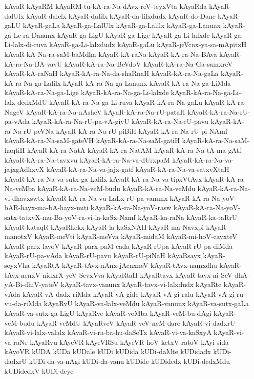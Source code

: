 {kAyaR
kAyaRM
kAyaRM-tu-kA-ra-Na-dAvx-reV-teyxVta
kAyaRda
kAyaR-dalUlx
kAyaR-dalelx
kAyaR-dalilx
kAyaR-da-lilxdudx
kAyaR-do-Dane
kAyaR-gaLU
kAyaR-gaLa
kAyaR-ga-LalUlx
kAyaR-ga-Lalilx
kAyaR-ga-Lanunx
kAyaR-ga-Le-ra-Danunx
kAyaR-ga-LigU
kAyaR-ga-Lige
kAyaR-ga-Li-lalxde
kAyaR-ga-Li-lalx-di-ruva
kAyaR-ga-Li-lalxdudx
kAyaR-gaLu
kAyaR-jeVcnx-ya-sa-mApitxH
kAyaR-kA-Na-ra-saM-baMdha
kAyaR-kA-raNa
kAyaR-kA-ra-Na-BAva
kAyaR-kA-ra-Na-BA-vavU
kAyaR-kA-ra-Na-BeVdoV
kAyaR-kA-ra-Na-Ga-samxreV
kAyaR-kA-raNaH
kAyaR-kA-ra-Na-da-shaRnaH
kAyaR-kA-ra-Na-gaLa
kAyaR-kA-ra-Na-ga-Lalilx
kAyaR-kA-ra-Na-ga-Lanunx
kAyaR-kA-ra-Na-ga-LiMda
kAyaR-kA-ra-Na-ga-Lige
kAyaR-kA-ra-Na-ga-Li-lalxde
kAyaR-kA-ra-Na-ga-Li-lalx-dedxMdU
kAyaR-kA-ra-Na-ga-Li-ruva
kAyaR-kA-ra-Na-gaLu
kAyaR-kA-ra-NageV
kAyaR-kA-ra-Na-nAsheV
kAyaR-kA-ra-Na-rU-pataH
kAyaR-kA-ra-Na-rU-pa-vAda
kAyaR-kA-ra-Na-rU-pa-vA-giyU
kAyaR-kA-ra-Na-rU-pavu
kAyaR-kA-ra-Na-rU-peVNa
kAyaR-kA-ra-Na-rU-piBiH
kAyaR-kA-ra-Na-rU-pi-NAmf
kAyaR-kA-ra-Na-saM-gateVH
kAyaR-kA-ra-Na-saM-gatiH
kAyaR-kA-ra-Na-saM-haqtiH
kAyaR-kA-ra-NatA
kAyaR-kA-ra-NatAM
kAyaR-kA-ra-Na-tA-ma-gAtf
kAyaR-kA-ra-Na-tavxvu
kAyaR-kA-ra-Na-va-dUrxpaM
kAyaR-kA-ra-Na-va-jajxgAdhxvX
kAyaR-kA-ra-Na-va-jajx-gatf
kAyaR-kA-ra-Na-va-satxvXtaH
kAyaR-kA-ra-Na-va-sutx-ga-Lalilx
kAyaR-kA-ra-Na-va-tipxVtAvx
kAyaR-kA-ra-Na-veMba
kAyaR-kA-ra-Na-veM-budu
kAyaR-kA-ra-Na-veMdu
kAyaR-kA-ra-Na-vi-dhavxswtx
kAyaR-kA-ra-Na-vu-LaLx-rU-pa-vanunx
kAyaR-kA-ra-Na-yoV-bAR-hayx-ma-bA-hayx-miti
kAyaR-kA-ra-Na-yoV-rasw
kAyaR-kA-ra-Na-yoV-satx-tatxvX-mu-Ba-yoV-ra-vi-la-kaSx-Namf
kAyaR-ka-raNa
kAyaR-ka-taRrU
kAyaR-kataqR
kAyaRkekx
kAyaR-la-kaSxNAH
kAyaR-ma-Navxpi
kAyaR-manotxV
kAyaR-meVti
kAyaR-meVva
kAyaR-midaM
kAyaR-mi-hoV-cayxteV
kAyaR-parx-layoV
kAyaR-parx-paM-cada
kAyaR-rUpa
kAyaR-rU-pa-diMda
kAyaR-rU-pa-vAda
kAyaR-rU-pavu
kAyaR-rU-piNaH
kAyaRsayx
kAyaR-seyxVha
kAyaRtA
kAyaR-tAvx-nAnx-jAcnxneV
kAyaR-tAvx-namxdhu
kAyaR-tAvx-nenxV-nidxrX-yeV-SevxVva
kAyaRtaH
kAyaRtavx
kAyaR-tavx-ni-SeV-dhA-yA-Bi-dhiV-yateV
kAyaR-tavx-vanunx
kAyaR-tavx-vi-lalxdudx
kAyaRte
kAyaR-vAda
kAyaR-vA-dadx-riMda
kAyaR-vA-gide
kAyaR-vA-gi-ralu
kAyaR-vA-gi-ru-vu-da-riMda
kAyaRvU
kAyaR-va-lalx-veMdu
kAyaR-vanunx
kAyaR-va-sutx-gaLa
kAyaR-va-sutx-ga-LigU
kAyaRve
kAyaR-veMba
kAyaR-veM-bu-dAgi
kAyaR-veM-budu
kAyaR-veMdU
kAyaRveV
kAyaR-veV-neM-dare
kAyaR-vi-dadxrU
kAyaR-vi-lalx-valalx
kAyaR-vi-ra-ba-hu-daSeTx
kAyaR-vi-va-kaSxyA
kAyaR-vi-va-raNe
kAyaRvu
kAyeVR
kAyeVRSu
kAyeVR-hoV-ketxV-ratoV
kAyi-sida
kAyoVR
kUDA
kUDa
kUDale
kUDi
kUDida
kUDi-daMte
kUDidadx
kUDi-dadxrU
kUDi-da-va-nAgi
kUDi-da-vanu
kUDide
kUDidedx
kUDi-dedxMdu
kUDidedxV
kUDi-deye
}
